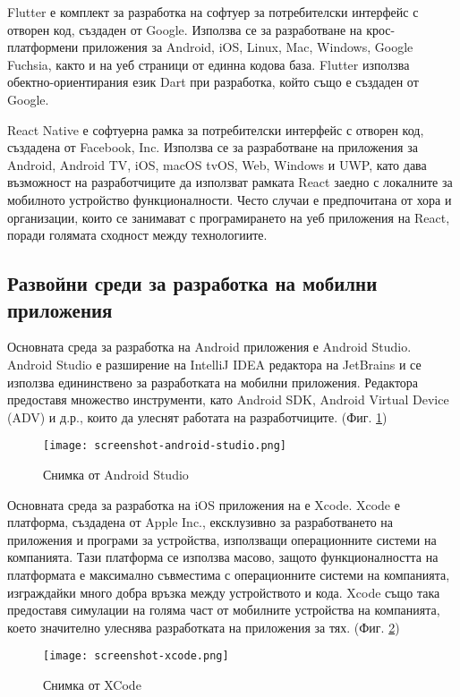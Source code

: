 Flutter е комплект за разработка на софтуер за потребителски интерфейс с отворен код, създаден от Google. Използва се за разработване на крос-платформени приложения за Android, iOS, Linux, Mac, Windows, Google Fuchsia, както и на уеб страници от единна кодова база. Flutter използва обектно-ориентирания език Dart при разработка, който също е създаден от Google.

React Native е софтуерна рамка за потребителски интерфейс с отворен код, създадена от Facebook, Inc. Използва се за разработване на приложения за Android, Android TV, iOS, macOS tvOS, Web, Windows и UWP, като дава възможност на разработчиците да използват рамката React заедно с локалните за мобилното устройство функционалности. Често случаи е предпочитана от хора и организации, които се занимават с програмирането на уеб приложения на React, поради голямата сходност между технологиите.

\subsection{Развойни среди за разработка на мобилни приложения}
Основната среда за разработка на Android приложения е Android Studio. Android Studio е разширение на IntelliJ IDEA редактора на JetBrains и се използва едининствено за разработката на мобилни приложения. Редактора предоставя множество инструменти, като Android SDK, Android Virtual Device (ADV) и д.р., които да улеснят работата на разработчиците. (Фиг. \ref{fig:screenshot-android-studio})

\begin{figure}[H]
    \texttt{[image: screenshot-android-studio.png]}
    \centering
    \caption{Снимка от Android Studio}
    \label{fig:screenshot-android-studio}
\end{figure}

Основната среда за разработка на iOS приложения на е Xcode. Xcode е платформа, създадена от Apple Inc., ексклузивно за разработването на приложения и програми за устройства, използващи операционните системи на компанията. Тази платформа се използва масово, защото функционалността на платформата е максимално съвместима с операционните системи на компанията, изграждайки много добра връзка между устройството и кода. Xcode също така предоставя симулации на голяма част от мобилните устройства на компанията, което значително улеснява разработката на приложения за тях. (Фиг. \ref{fig:screenshot-xcode})

\begin{figure}[H]
    \texttt{[image: screenshot-xcode.png]}
    \centering
    \caption{Снимка от XCode}
    \label{fig:screenshot-xcode}
\end{figure}


